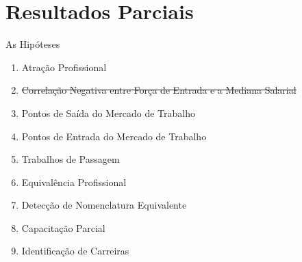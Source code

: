 \documentclass[10pt, hyperref={pdfpagelabels=false}]{beamer}
\begin{document}
\section{Resultados Parciais}

\begin{frame}[label=hipoteses]{As Hipóteses}
  \begin{enumerate}
    \item \alert{Atração Profissional}
    \item \sout{Correlação Negativa entre Força de Entrada e a Mediana Salarial}
    \item \alert{Pontos de Saída do Mercado de Trabalho}
    \item \alert{Pontos de Entrada do Mercado de Trabalho}
    \item Trabalhos de Passagem
    \item Equivalência Profissional 
    \item Detecção de Nomenclatura Equivalente 
    \item \alert{Capacitação Parcial}
    \item \alert{Identificação de Carreiras}
  \end{enumerate}
\end{frame}
\end{document}
